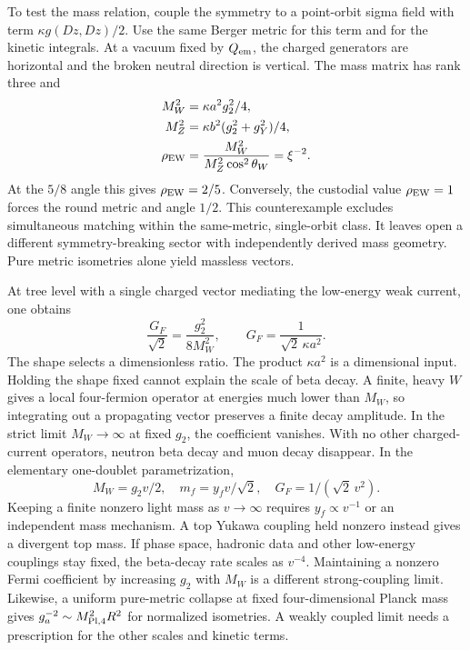 \documentclass[11pt,oneside]{article}
\begin{document}
To test the mass relation, couple the symmetry to a point-orbit sigma field with term \(\kappa g(Dz,Dz)/2\). Use the same Berger metric for this term and for the kinetic integrals. At a vacuum fixed by \(Q_{\rm em}\), the charged generators are horizontal and the broken neutral direction is vertical. The mass matrix has rank three and
\begin{align*}
 M_W^2&=\kappa a^2g_2^2/4,\\
 M_Z^2&=\kappa b^2(g_2^2+g_Y^2)/4,\\
 \rho_{\rm EW}&=\frac{M_W^2}{M_Z^2\cos^2\theta_W}
              =\xi^{-2}.
\end{align*}
At the \(5/8\) angle this gives \(\rho_{\rm EW}=2/5\). Conversely, the custodial value \(\rho_{\rm EW}=1\) forces the round metric and angle \(1/2\). This counterexample excludes simultaneous matching within the same-metric, single-orbit class. It leaves open a different symmetry-breaking sector with independently derived mass geometry. Pure metric isometries alone yield massless vectors.

At tree level with a single charged vector mediating the low-energy weak current, one obtains
\[
 \frac{G_F}{\sqrt 2}=\frac{g_2^2}{8M_W^2},\qquad
 G_F=\frac{1}{\sqrt2\,\kappa a^2}.
\]
The shape selects a dimensionless ratio. The product \(\kappa a^2\) is a dimensional input. Holding the shape fixed cannot explain the scale of beta decay. A finite, heavy \(W\) gives a local four-fermion operator at energies much lower than \(M_W\), so integrating out a propagating vector preserves a finite decay amplitude. In the strict limit \(M_W\to\infty\) at fixed \(g_2\), the coefficient vanishes. With no other charged-current operators, neutron beta decay and muon decay disappear. In the elementary one-doublet parametrization,
\[
 M_W=g_2v/2,\quad m_f=y_fv/\sqrt2,\quad
 G_F=1/(\sqrt2\,v^2).
\]
Keeping a finite nonzero light mass as \(v\to\infty\) requires \(y_f\propto v^{-1}\) or an independent mass mechanism. A top Yukawa coupling held nonzero instead gives a divergent top mass. If phase space, hadronic data and other low-energy couplings stay fixed, the beta-decay rate scales as \(v^{-4}\). Maintaining a nonzero Fermi coefficient by increasing \(g_2\) with \(M_W\) is a different strong-coupling limit. Likewise, a uniform pure-metric collapse at fixed four-dimensional Planck mass gives \(g_a^{-2}\sim M_{\rm Pl,4}^2R^2\) for normalized isometries. A weakly coupled limit needs a prescription for the other scales and kinetic terms.
\end{document}

